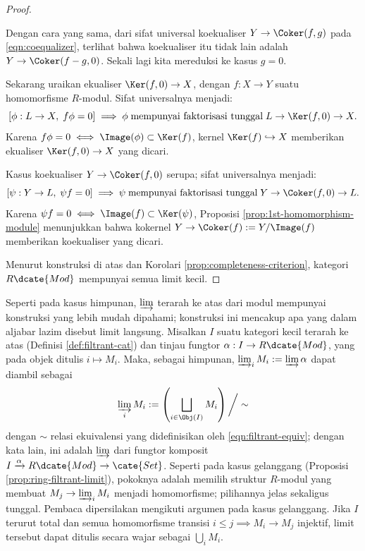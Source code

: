 \begin{proof}
\begin{asparaenum}
		Dengan cara yang sama, dari sifat universal koekualiser $Y \to \Coker(f,g)$ pada \eqref{eqn:coequalizer}, terlihat bahwa koekualiser itu tidak lain adalah $Y \to \Coker(f-g, 0)$. Sekali lagi kita mereduksi ke kasus $g=0$.

		\item Sekarang uraikan ekualiser $\Ker(f,0) \to X$, dengan $f: X \to Y$ suatu homomorfisme $R$-modul. Sifat universalnya menjadi:
			\[ \left[ \phi: L \to X, \; f \phi = 0 \right] \implies \phi \; \text{mempunyai faktorisasi tunggal} \; L \to \Ker(f,0) \to X. \]
			Karena $f\phi = 0 \iff \Image(\phi) \subset \Ker(f)$, kernel $\Ker(f) \hookrightarrow X$ memberikan ekualiser $\Ker(f,0) \to X$ yang dicari.

		\item Kasus koekualiser $Y \to \Coker(f,0)$ serupa; sifat universalnya menjadi:
			\[ \left[ \psi: Y \to L, \; \psi f = 0 \right] \implies \psi \; \text{mempunyai faktorisasi tunggal} \; Y \to \Coker(f,0) \to L. \]
			Karena $\psi f = 0 \iff \Image(f) \subset \Ker(\psi)$, Proposisi \ref{prop:1st-homomorphism-module} menunjukkan bahwa kokernel $Y \to \Coker(f) := Y/\Image(f)$ memberikan koekualiser yang dicari.
	\end{asparaenum}

	Menurut konstruksi di atas dan Korolari \ref{prop:completeness-criterion}, kategori $R\dcate{Mod}$ mempunyai semua limit kecil.
\end{proof}

\begin{remark}\label{rem:filtrant-mod-limit}
	Seperti pada kasus himpunan, $\varinjlim$ terarah ke atas dari modul mempunyai konstruksi yang lebih mudah dipahami; konstruksi ini mencakup apa yang dalam aljabar lazim disebut limit langsung. Misalkan $I$ suatu kategori kecil terarah ke atas (Definisi \ref{def:filtrant-cat}) dan tinjau fungtor $\alpha: I \to R\dcate{Mod}$, yang pada objek ditulis $i \mapsto M_i$. Maka, sebagai himpunan, $\varinjlim_i M_i := \varinjlim \alpha$ dapat diambil sebagai
	\[ \varinjlim_i M_i := \left( \bigsqcup_{i \in \Obj(I)} M_i \right) \bigg/\sim \]
	dengan $\sim$ relasi ekuivalensi yang didefinisikan oleh \eqref{eqn:filtrant-equiv}; dengan kata lain, ini adalah $\varinjlim$ dari fungtor komposit $I \xrightarrow{\alpha} R\dcate{Mod} \to \cate{Set}$. Seperti pada kasus gelanggang (Proposisi \ref{prop:ring-filtrant-limit}), pokoknya adalah memilih struktur $R$-modul yang membuat $M_j \to \varinjlim_i M_i$ menjadi homomorfisme; pilihannya jelas sekaligus tunggal. Pembaca dipersilakan mengikuti argumen pada kasus gelanggang. Jika $I$ terurut total dan semua homomorfisme transisi $i \leq j \implies M_i \to M_j$ injektif, limit tersebut dapat ditulis secara wajar sebagai $\bigcup_i M_i$.
\end{remark}

